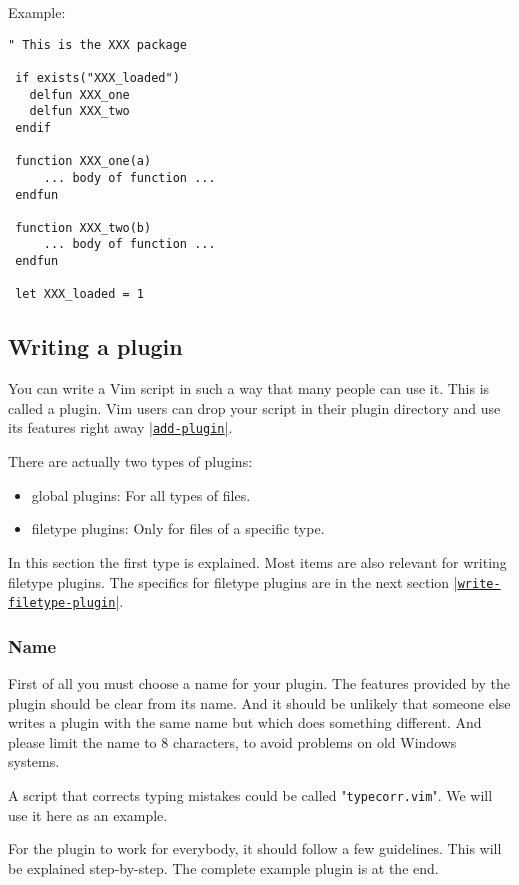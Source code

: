 Example:

\begin{Verbatim}[samepage=true]
 " This is the XXX package

 if exists("XXX_loaded")
   delfun XXX_one
   delfun XXX_two
 endif

 function XXX_one(a)
     ... body of function ...
 endfun

 function XXX_two(b)
     ... body of function ...
 endfun

 let XXX_loaded = 1
\end{Verbatim}
\subsection{Writing a plugin}
\label{Writing a plugin}
\label{write-plugin}
You can write a Vim script in such a way that many people can use it.
This is called a plugin.
Vim users can drop your script in their plugin directory and use its features right away \hyperref[add-plugin]{|\texttt{add-plugin}|}.

There are actually two types of plugins:
\begin{itemize}
				\item global plugins: For all types of files.
				\item filetype plugins: Only for files of a specific type.
\end{itemize}

In this section the first type is explained.
Most items are also relevant for writing filetype plugins.
The specifics for filetype plugins are in the next section \hyperref[write-filetype-plugin]{|\texttt{write-filetype-plugin}|}.

\subsubsection{Name}
First of all you must choose a name for your plugin.
The features provided by the plugin should be clear from its name.
And it should be unlikely that someone else writes a plugin with the same name but which does something different.
And please limit the name to 8 characters, to avoid problems on old Windows systems.

A script that corrects typing mistakes could be called "\texttt{typecorr.vim}".
We will use it here as an example.

For the plugin to work for everybody, it should follow a few guidelines.
This will be explained step-by-step.
The complete example plugin is at the end.


